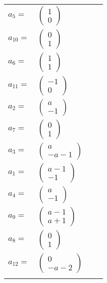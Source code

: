 \documentclass[1p]{elsarticle_modified}
\theoremstyle{definition}
\begin{document}
\begin{tabular}{m{7pt} m{180pt} m{7pt} m{180pt} }
\flushright $a_{5}=$&$\begin{pmatrix}1\\0\end{pmatrix}$ \\
\flushright $a_{10}=$&$\begin{pmatrix}0\\1\end{pmatrix}$ \\
\flushright $a_{6}=$&$\begin{pmatrix}1\\1\end{pmatrix}$ \\
\flushright $a_{11}=$&$\begin{pmatrix}-1\\0\end{pmatrix}$ \\
\flushright $a_{2}=$&$\begin{pmatrix}a\\-1\end{pmatrix}$ \\
\flushright $a_{7}=$&$\begin{pmatrix}0\\1\end{pmatrix}$ \\
\flushright $a_{3}=$&$\begin{pmatrix}a\\- a-1\end{pmatrix}$ \\
\flushright $a_{1}=$&$\begin{pmatrix}a-1\\-1\end{pmatrix}$ \\
\flushright $a_{4}=$&$\begin{pmatrix}a\\-1\end{pmatrix}$ \\
\flushright $a_{9}=$&$\begin{pmatrix}a-1\\a+1\end{pmatrix}$ \\
\flushright $a_{8}=$&$\begin{pmatrix}0\\1\end{pmatrix}$ \\
\flushright $a_{12}=$&$\begin{pmatrix}0\\- a-2\end{pmatrix}$\\&\end{tabular}
\end{document}
